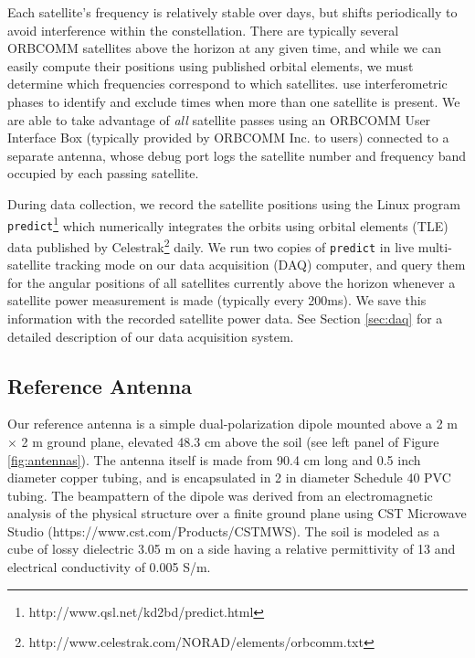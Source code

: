 Each satellite's frequency is relatively stable over days, but shifts periodically to avoid interference within the constellation. There are typically several ORBCOMM satellites above the horizon at any given time, and while we can easily compute their positions using published orbital elements, we must determine which frequencies correspond to which satellites. \citet{zheng14} use interferometric phases to identify and exclude times when more than one satellite is present. We are able to take advantage of \textit{all} satellite passes using an ORBCOMM User Interface Box (typically provided by ORBCOMM Inc. to users) connected to a separate antenna, whose debug port logs the satellite number and frequency band occupied by each passing satellite. 

During data collection, we record the satellite positions using the Linux program {\tt predict}\footnote{http://www.qsl.net/kd2bd/predict.html} which numerically integrates the orbits using orbital elements (TLE) data published by Celestrak\footnote{http://www.celestrak.com/NORAD/elements/orbcomm.txt} daily. We run two copies of {\tt predict} in live multi-satellite tracking mode on our data acquisition (DAQ) computer, and query them for the angular positions of all satellites currently above the horizon whenever a satellite power measurement is made (typically every 200ms). We save this information with the recorded satellite power data. See Section \ref{sec:daq} for a detailed description of our data acquisition system.

\subsection{Reference Antenna}
\label{sec:refant}
Our reference antenna is a simple dual-polarization dipole mounted above a 2 m $\times$ 2 m ground plane, elevated 48.3 cm above the soil (see left panel of Figure \ref{fig:antennas}). The antenna itself is made from 90.4 cm long and 0.5 inch diameter copper tubing, and is encapsulated in 2 in diameter Schedule 40 PVC tubing. The beampattern of the dipole was derived from an electromagnetic analysis of the physical structure over a finite ground plane using CST Microwave Studio (https://www.cst.com/Products/CSTMWS). The soil is modeled as a cube of lossy dielectric 3.05 m on a side having a relative permittivity of 13 and electrical conductivity of 0.005 S/m. 

